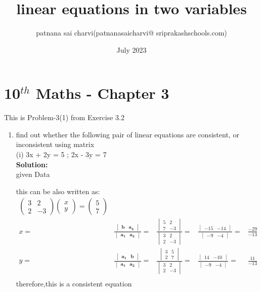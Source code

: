 \documentclass{article}
\date{July 2023}
\title{linear equations in two variables}
\author{patnana sai charvi(patnanasaicharvi@ sriprakashschools.com)}
\newcommand{\myvec}[1]{\ensuremath{\begin{pmatrix}#1\end{pmatrix}}}
\newcommand{\mydet}[1]{\ensuremath{\begin{vmatrix}#1\end{vmatrix}}}
\newcommand{\solution}{\noindent \textbf{Solution: }}
\let\vec\mathbf
\begin{document}
\maketitle
\section*{10$^{th}$ Maths - Chapter 3}
This is Problem-3(1) from Exercise 3.2
\begin{enumerate}
\item  find out whether the following pair of linear equations are consistent, or inconsistent using matrix\\
    (i) 3x + 2y = 5 ; 2x - 3y = 7\\
\solution\\
given Data


this can be also written as:
\begin{align}
\myvec{3&2\\2&-3}\myvec{x\\y} = \myvec{5\\7}\\
x =&
\frac{\mydet{ \vec{b} & \vec{a_2}}}{\mydet{\vec{a_1} & \vec{a_2}}}=&
\frac{\mydet{5 & 2\\7 & -3 }}{\mydet{3 & 2\\2 & -3}}=&
\frac{\mydet{-15&-14}}{\mydet{-9&-4}}=&
\frac{-29}{-13}\\
 y=&
\frac{\mydet{\vec{a_1} & \vec{b} }}{\mydet{\vec{a_1} &\vec{a_2} }}=&
\frac{\mydet{3&5\\2&7}}{\mydet{3&2\\2&-3}}=&
\frac{\mydet{14&-10}}{\mydet{-9&-4}}=&
\frac{11}{-13}\\
\end{align}
therefore,this is a consistent equation


\end{enumerate}
\end{document}

